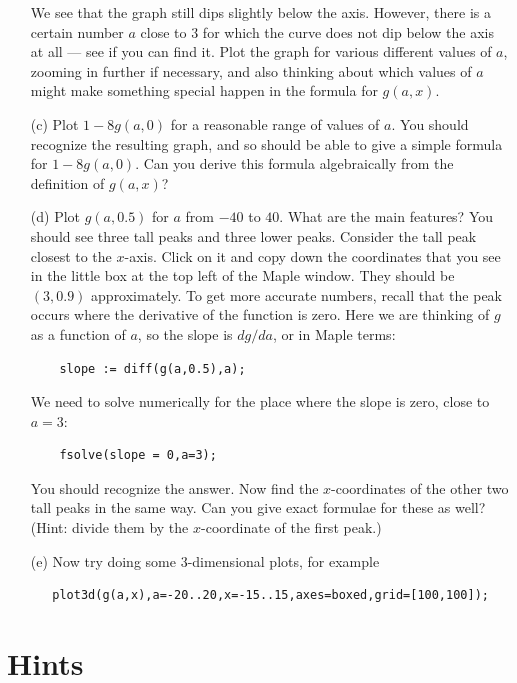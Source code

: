 \documentclass[a4paper,10pt]{amsbook}
\begin{document}
\begin{exercise}
\begin{itemize}
   We see that the graph still dips slightly below the axis.
   However, there is a certain number $a$ close to $3$ for
   which the curve does not dip below the axis at all ---
   see if you can find it.  Plot the graph for various
   different values of $a$, zooming in further if necessary,
   and also thinking about which values of $a$ might make
   something special happen in the formula for $g(a,x)$.
  \item[(c)] Plot $1-8g(a,0)$ for a reasonable range of
   values of $a$.  You should recognize the resulting graph,
   and so should be able to give a simple formula for
   $1-8g(a,0)$.  Can you derive this formula algebraically
   from the definition of $g(a,x)$?
  \item[(d)] Plot $g(a,0.5)$ for $a$ from $-40$ to $40$.
   What are the main features?  You should see three tall
   peaks and three lower peaks.  Consider the tall peak
   closest to the $x$-axis.  Click on it and copy down the
   coordinates that you see in the little box at the top
   left of the Maple window.  They should be $(3,0.9)$
   approximately.  To get more accurate numbers, recall that
   the peak occurs where the derivative of the function is
   zero.  Here we are thinking of $g$ as a function of $a$,
   so the slope is $dg/da$, or in Maple terms:
\begin{verbatim}
    slope := diff(g(a,0.5),a);
\end{verbatim}
   We need to solve numerically for the place where the
   slope is zero, close to $a=3$:
\begin{verbatim}
    fsolve(slope = 0,a=3);
\end{verbatim}
   You should recognize the answer.  Now find the
   $x$-coordinates of the other two tall peaks in the same
   way.  Can you give exact formulae for these as well?
   (Hint: divide them by the $x$-coordinate of the first
   peak.)
  \item[(e)] Now try doing some $3$-dimensional plots, for
   example
\begin{verbatim}
   plot3d(g(a,x),a=-20..20,x=-15..15,axes=boxed,grid=[100,100]);
\end{verbatim}
 \end{itemize}
\end{exercise}

\section*{Hints}
\end{document}
